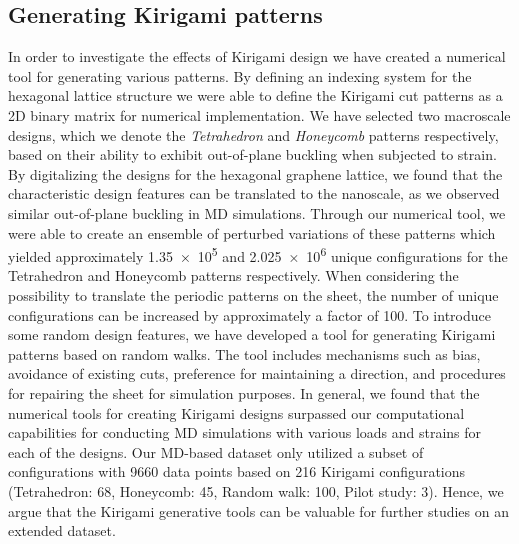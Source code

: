 \subsection{Generating Kirigami patterns}
In order to investigate the effects of Kirigami design we have created a
numerical tool for generating various patterns. By defining an indexing system
for the hexagonal lattice structure we were able to define the Kirigami cut patterns
as a 2D binary matrix for numerical implementation. We have selected two
macroscale designs, which we denote the \textit{Tetrahedron} and
\textit{Honeycomb} patterns respectively, based on their ability to exhibit out-of-plane
buckling when subjected to strain. By digitalizing the designs for the
hexagonal graphene lattice, we found that the characteristic design features can
be translated to the nanoscale, as we observed similar out-of-plane buckling in
\acrshort{MD} simulations. Through our numerical tool, we were able to create an
ensemble of perturbed variations of these patterns which yielded approximately \num{1.35e5}
and \num{2.025e6} unique configurations for the Tetrahedron and Honeycomb
patterns respectively. When considering the possibility to translate the
periodic patterns on the sheet, the number of unique configurations can be increased
by approximately a factor of 100. To introduce some random design features, we
have developed a tool for generating Kirigami patterns based on random walks.
The tool includes mechanisms such as bias, avoidance of existing cuts,
preference for maintaining a direction, and procedures for repairing the sheet
for simulation purposes. In general, we found that the numerical tools for creating Kirigami designs
surpassed our computational capabilities for conducting \acrshort{MD}
simulations with various loads and strains for each of the designs. Our
\acrshort{MD}-based dataset only utilized a subset of configurations with 9660
data points based on 216 Kirigami configurations (Tetrahedron: 68, Honeycomb:
45, Random walk: 100, Pilot study: 3). Hence, we argue that the Kirigami
generative tools can be valuable for further studies on an extended dataset.




